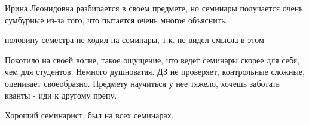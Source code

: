                 \begin{commentbox} 
                    Ирина Леонидовна разбирается в своем предмете, но семинары получается очень сумбурные из-за того, что пытается очень многое объяснить. 
                \end{commentbox} 
            
                \begin{commentbox} 
                    половину семестра не ходил на семинары, т.к. не видел смысла в этом 
                \end{commentbox} 
            
                \begin{commentbox} 
                    Покотило на своей волне, такое ощущение, что ведет семинары скорее для себя, чем для студентов. Немного душноватая. ДЗ не проверяет, контрольные сложные, оценивает своеобразно. Предмету научиться у нее тяжело, хочешь заботать кванты - иди к другому препу.
                \end{commentbox} 
            
                \begin{commentbox} 
                    Хороший семинарист, был на всех семинарах. 
                \end{commentbox} 


